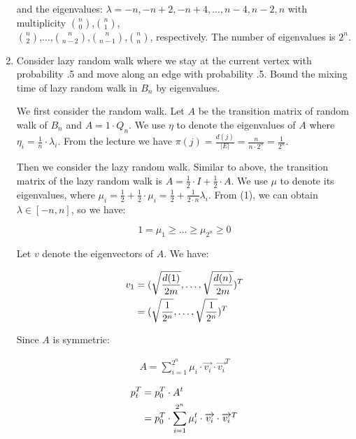 \begin{enumerate}
  and the eigenvalues:
  $\lambda=-n,-n+2,-n+4,...,n-4,n-2,n$ with multiplicity
  $\binom{n}{0}$,$\binom{n}{1}$,\\$\binom{n}{2}$,...,$\binom{n}{n-2}$,$\binom{n}{n-1}$,$\binom{n}{n}$, respectively.
  The number of eigenvalues is $2^n$.

	\item Consider lazy random walk where we stay at the current vertex with probability .5 and move along an edge with probability .5. Bound the mixing time of lazy random walk in	$B_n$ by eigenvalues.
	
  \Answer
  We first consider the random walk.
	Let $A$ be the transition matrix of random walk of $B_n$ and $A = 1 \cdot Q_n$. We use $\eta$ to denote the eigenvalues of $A$ where $\eta_i = \frac{1}{n} \cdot \lambda_i$. From the lecture we have $\pi(j)=\frac{d(j)}{|E|}= \frac{n}{n \cdot 2^n}=\frac{1}{2^n}$.

  Then we consider the lazy random walk. Similar to above, the transition matrix of the lazy random walk is $A= \frac{1}{2} \cdot I + \frac{1}{2} \cdot A$. We use $\mu$ to denote its eigenvalues, where $\mu_i = \frac{1}{2} + \frac{1}{2} \cdot \mu_i =\frac{1}{2} + \frac{1}{2 \cdot n}\lambda_i$. From (1), we can obtain $\lambda \in [-n, n]$, so we have:

  \begin{equation}
    1 = \mu_1 \geq \dots \geq \mu_{2^n} \geq 0
  \end{equation}
  
  Let $v$ denote the eigenvectors of $A$. We have:

  \begin{align}
    v_1 &= (\sqrt{\frac{d(1)}{2m}}, \dots, \sqrt{\frac{d(n)}{2m}})^T \notag \\
    &=(\sqrt{\frac{1}{2^n}}, \dots, \sqrt{\frac{1}{2^n}})^T
  \end{align}

  Since $A$ is symmetric:

  \begin{align}
    A = \sum\limits_{i=1}^{2^n} \mu_i \cdot \overrightarrow{v_i} \cdot \overrightarrow{v_i}^T
  \end{align}

  
  \begin{align}
    p_t^T &= p_0^T \cdot A^t \notag \\
    &= p_0^T \cdot \sum\limits_{i=1}^{2^n} \mu_i^t \cdot \overrightarrow{v_i} \cdot \overrightarrow{v_i}^T
  \end{align}


\end{enumerate}
